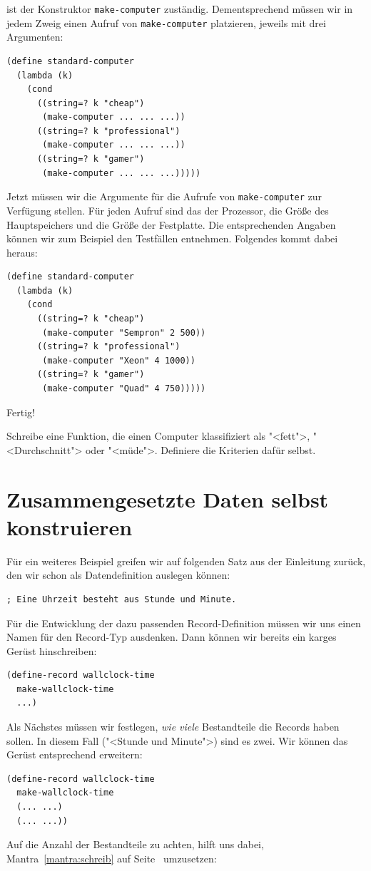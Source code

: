 ist der Konstruktor \lstinline{make-computer} zuständig.  Dementsprechend
müssen wir in jedem Zweig einen Aufruf von \lstinline{make-computer}
platzieren, jeweils mit drei Argumenten:
%
\begin{lstlisting}
(define standard-computer
  (lambda (k)
    (cond
      ((string=? k "cheap")
       (make-computer ... ... ...))
      ((string=? k "professional")
       (make-computer ... ... ...))
      ((string=? k "gamer")
       (make-computer ... ... ...)))))
\end{lstlisting}
%
Jetzt müssen wir die Argumente für die Aufrufe von
\lstinline{make-computer} zur Verfügung stellen.  Für jeden Aufruf sind
das der Prozessor, die Größe des Hauptspeichers und die
Größe der Festplatte.  Die entsprechenden Angaben können wir zum
Beispiel den Testfällen entnehmen.  Folgendes kommt dabei heraus:
%
\begin{lstlisting}
(define standard-computer
  (lambda (k)
    (cond
      ((string=? k "cheap")
       (make-computer "Sempron" 2 500))
      ((string=? k "professional")
       (make-computer "Xeon" 4 1000))
      ((string=? k "gamer")
       (make-computer "Quad" 4 750)))))
\end{lstlisting}
%
Fertig!

\begin{aufgabeinline}
  Schreibe eine Funktion, die einen Computer klassifiziert als
  "<fett">, "<Durchschnitt"> oder "<müde">.  Definiere die Kriterien
  dafür selbst.
\end{aufgabeinline}

\section{Zusammengesetzte Daten selbst konstruieren}

%
Für ein weiteres Beispiel greifen wir auf folgenden Satz aus der
Einleitung zurück, den wir schon als Datendefinition auslegen können:
%
\begin{lstlisting}
; Eine Uhrzeit besteht aus Stunde und Minute.
\end{lstlisting}
%
Für die Entwicklung der dazu passenden Record-Definition müssen wir
uns einen Namen für den Record-Typ ausdenken.  Dann können wir bereits
ein karges Gerüst hinschreiben:
%
\begin{lstlisting}
(define-record wallclock-time
  make-wallclock-time
  ...)
\end{lstlisting}
%
Als Nächstes müssen wir festlegen, \emph{wie viele} Bestandteile die
Records haben sollen.  In diesem Fall ("<Stunde und Minute">) sind es
zwei.  Wir können das Gerüst entsprechend erweitern:
%
\begin{lstlisting}
(define-record wallclock-time
  make-wallclock-time
  (... ...)
  (... ...))
\end{lstlisting}
%
Auf die Anzahl der Bestandteile zu achten, hilft uns dabei, 
Mantra~\ref{mantra:schreib} auf Seite~\pageref{mantra:schreib}
umzusetzen:

